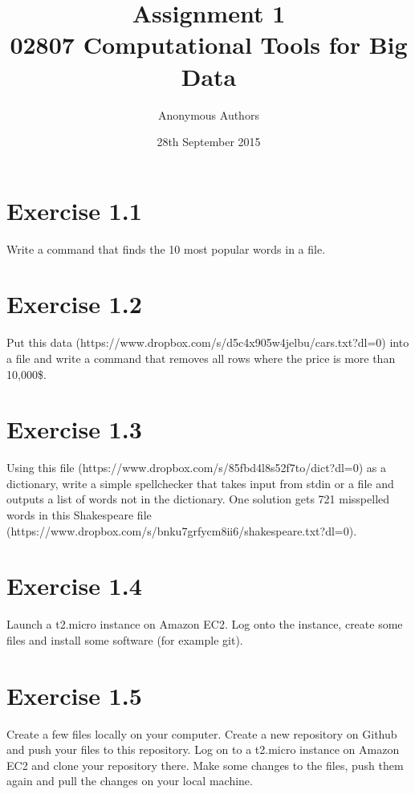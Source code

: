 \documentclass{article}
\title{Assignment 1\\02807 Computational Tools for Big Data}
\author{Anonymous Authors}
\date{28th September 2015}
\begin{document}
\maketitle

\section{Exercise 1.1}
Write a command that finds the 10 most popular words in a file.
%

\section{Exercise 1.2}
Put this data (https://www.dropbox.com/s/d5c4x905w4jelbu/cars.txt?dl=0) into a file and write a command that removes all rows where the price is more than 10,000\$.
%
%





\section{Exercise 1.3}
Using this file (https://www.dropbox.com/s/85fbd4l8s52f7to/dict?dl=0) as a dictionary, write a simple spellchecker that takes input from stdin or a file and outputs a list of words not in the dictionary. One solution gets 721 misspelled words in this Shakespeare file (https://www.dropbox.com/s/bnku7grfycm8ii6/shakespeare.txt?dl=0).
%



\section{Exercise 1.4}
Launch a t2.micro instance on Amazon EC2. Log onto the instance, create some files and install some software (for example git).
\section{Exercise 1.5}
Create a few files locally on your computer. Create a new repository on Github and push your files to this repository. Log on to a t2.micro instance on Amazon EC2 and clone your repository there. Make some changes to the files, push them again and pull the changes on your local machine.
\end{document}

